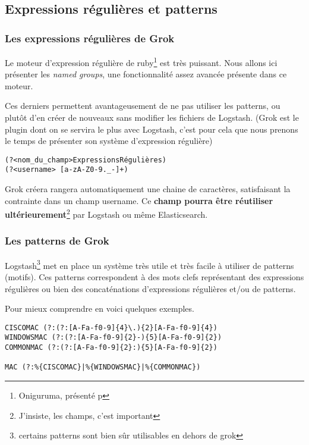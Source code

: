 \subsection{Expressions régulières et patterns}

\subsubsection{Les expressions régulières de Grok}
Le moteur d'expression régulière de ruby\footnote{Oniguruma, présenté p\pageref{subsec:logstashregexengine}} est très puissant. 
Nous allons ici présenter les \emph{named groups}, une fonctionnalité assez avancée 
présente dans ce moteur.

Ces derniers permettent avantageusement de ne pas utiliser les patterns, ou plutôt d'en créer
de nouveaux sans modifier les fichiers de Logstash.
{\footnotesize(Grok est le plugin dont on se servira le plus avec Logstash, c'est 
pour cela que nous prenons le temps de présenter son système d'expression régulière)}


\begin{lstlisting}[style=logstash,label={lst:grokregex1},caption={Named group}]
(?<nom_du_champ>ExpressionsRégulières) 
(?<username> [a-zA-Z0-9._-]+)
\end{lstlisting}

Grok créera rangera automatiquement une chaine de caractères, satisfaisant la contrainte 
\ipath{/[a-zA-Z0-9.\_-]+/}  dans un champ  username. 
Ce \textbf{champ pourra être réutiliser ultérieurement}\footnote{J'insiste, les 
champs, c'est important} par Logstash ou même Elasticsearch.

\subsubsection{Les patterns de Grok}
Logstash\footnote{certains patterns sont bien sûr utilisables en dehors de grok} 
met en place un système très utile et très facile à utiliser de patterns 
(motifs). Ces patterns correspondent à des mots clefs représentant des expressions 
régulières ou bien des concaténations d'expressions régulières et/ou de patterns.

Pour mieux comprendre en voici quelques exemples. 

\begin{lstlisting}[style=logstash,label={lst:patternsexplication1},caption={Exemple de définition et d'utilisation de Patterns}]
CISCOMAC (?:(?:[A-Fa-f0-9]{4}\.){2}[A-Fa-f0-9]{4})
WINDOWSMAC (?:(?:[A-Fa-f0-9]{2}-){5}[A-Fa-f0-9]{2})
COMMONMAC (?:(?:[A-Fa-f0-9]{2}:){5}[A-Fa-f0-9]{2})

MAC (?:%{CISCOMAC}|%{WINDOWSMAC}|%{COMMONMAC})
\end{lstlisting}

